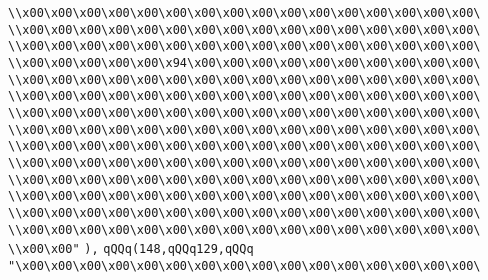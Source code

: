 \verb|\\x00\x00\x00\x00\x00\x00\x00\x00\x00\x00\x00\x00\x00\x00\x00\x00\|\newline
\verb|\\x00\x00\x00\x00\x00\x00\x00\x00\x00\x00\x00\x00\x00\x00\x00\x00\|\newline
\verb|\\x00\x00\x00\x00\x00\x00\x00\x00\x00\x00\x00\x00\x00\x00\x00\x00\|\newline
\verb|\\x00\x00\x00\x00\x00\x94\x00\x00\x00\x00\x00\x00\x00\x00\x00\x00\|\newline
\verb|\\x00\x00\x00\x00\x00\x00\x00\x00\x00\x00\x00\x00\x00\x00\x00\x00\|\newline
\verb|\\x00\x00\x00\x00\x00\x00\x00\x00\x00\x00\x00\x00\x00\x00\x00\x00\|\newline
\verb|\\x00\x00\x00\x00\x00\x00\x00\x00\x00\x00\x00\x00\x00\x00\x00\x00\|\newline
\verb|\\x00\x00\x00\x00\x00\x00\x00\x00\x00\x00\x00\x00\x00\x00\x00\x00\|\newline
\verb|\\x00\x00\x00\x00\x00\x00\x00\x00\x00\x00\x00\x00\x00\x00\x00\x00\|\newline
\verb|\\x00\x00\x00\x00\x00\x00\x00\x00\x00\x00\x00\x00\x00\x00\x00\x00\|\newline
\verb|\\x00\x00\x00\x00\x00\x00\x00\x00\x00\x00\x00\x00\x00\x00\x00\x00\|\newline
\verb|\\x00\x00\x00\x00\x00\x00\x00\x00\x00\x00\x00\x00\x00\x00\x00\x00\|\newline
\verb|\\x00\x00\x00\x00\x00\x00\x00\x00\x00\x00\x00\x00\x00\x00\x00\x00\|\newline
\verb|\\x00\x00\x00\x00\x00\x00\x00\x00\x00\x00\x00\x00\x00\x00\x00\x00\|\newline
\verb|\\x00\x00"|\newline
\verb|),|\newline
\verb|qQQq(148,qQQq129,qQQq|\newline
\verb|"\x00\x00\x00\x00\x00\x00\x00\x00\x00\x00\x00\x00\x00\x00\x00\x00\|\newline
